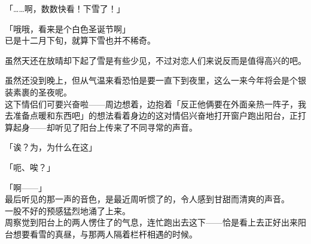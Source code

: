 「……啊，数数快看！下雪了！」

「哦哦，看来是个白色圣诞节啊」\\

已是十二月下旬，就算下雪也并不稀奇。

虽然天还在放晴却下起了雪是有些少见，不过对恋人们来说反而是值得高兴的吧。

虽然还没到晚上，但从气温来看恐怕是要一直下到夜里，这么一来今年将会是个银装素裹的圣夜呢。\\

这下情侣们可要兴奋啦——周边想着，边抱着「反正他俩要在外面亲热一阵子，我去准备点暖和东西吧」的想法看着身边的这对情侣兴奋地打开窗户跑出阳台，正打算起身——却听见了阳台上传来了不同寻常的声音。

「诶？为，为什么在这」

「呃、唉？」

「啊——」\\

最后听见的那一声的音色，是最近周听惯了的，令人感到甘甜而清爽的声音。\\

一股不好的预感猛烈地涌了上来。\\

周察觉到阳台上的两人愣住了的气息，连忙跑出去这下——恰是看上去正好出来阳台想要看雪的真昼，与那两人隔着栏杆相遇的时候。
